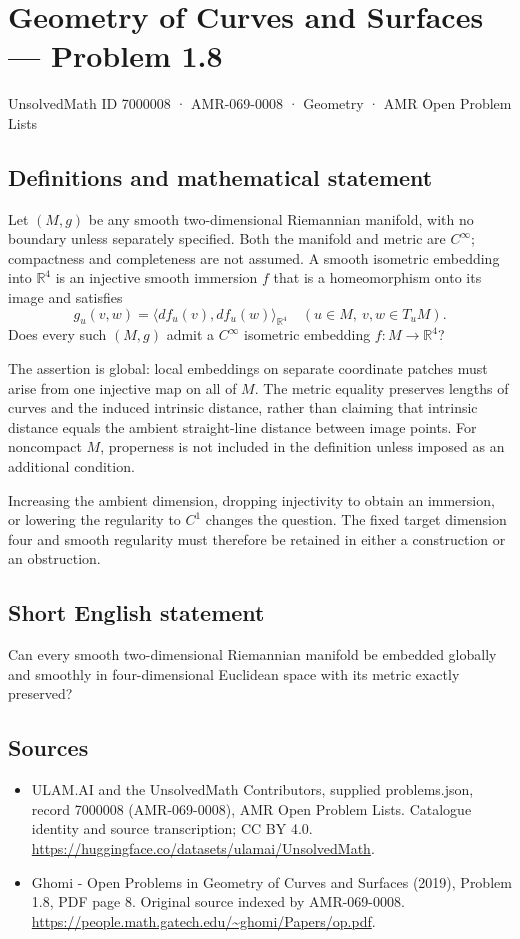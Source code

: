 \documentclass[11pt,a4paper]{article}
\begin{document}
\section*{Geometry of Curves and Surfaces — Problem 1.8}\label{7000008}
{\small UnsolvedMath ID 7000008 · AMR-069-0008 · Geometry · AMR Open Problem Lists}
\subsection{Definitions and mathematical statement}
Let $(M,g)$ be any smooth two-dimensional Riemannian manifold,
with no boundary unless separately specified. Both the manifold
and metric are $C^\infty$; compactness and completeness are not
assumed. A smooth isometric embedding into $\mathbb R^4$ is an
injective smooth immersion $f$ that is a homeomorphism onto its
image and satisfies
\[
           g_u(v,w)=\langle df_u(v),df_u(w)\rangle_{\mathbb R^4}
           \quad(u\in M,\ v,w\in T_uM).
\]
Does every such $(M,g)$ admit a $C^\infty$ isometric embedding
$f:M\to\mathbb R^4$?

The assertion is global: local embeddings on separate coordinate
patches must arise from one injective map on all of $M$. The
metric equality preserves lengths of curves and the induced
intrinsic distance, rather than claiming that intrinsic distance
equals the ambient straight-line distance between image points.
For noncompact $M$, properness is not included in the definition
unless imposed as an additional condition.

Increasing the ambient dimension, dropping injectivity to obtain
an immersion, or lowering the regularity to $C^1$ changes the
question. The fixed target dimension four and smooth regularity
must therefore be retained in either a construction or an
obstruction.
\subsection{Short English statement}
Can every smooth two-dimensional Riemannian manifold be embedded
globally and smoothly in four-dimensional Euclidean space with
its metric exactly preserved?
\subsection{Sources}
\begin{itemize}
\item[S1] ULAM.AI and the UnsolvedMath Contributors, supplied problems.json, record 7000008 (AMR-069-0008), AMR Open Problem Lists. Catalogue identity and source transcription; CC BY 4.0.
\url{https://huggingface.co/datasets/ulamai/UnsolvedMath}.
\item[S2] Ghomi - Open Problems in Geometry of Curves and Surfaces (2019), Problem 1.8, PDF page 8. Original source indexed by AMR-069-0008.
\url{https://people.math.gatech.edu/~ghomi/Papers/op.pdf}.
\end{itemize}
\end{document}

